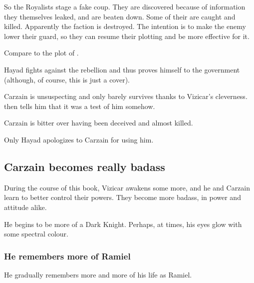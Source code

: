 \begin{garbage}
So the Royalists stage a fake coup. They are discovered because of information they themselves leaked, and are beaten down. Some of their  are caught and killed. Apparently the faction is destroyed. The intention is to make the enemy lower their guard, so they can resume their plotting and be more effective for it. 

Compare to the plot of . 

Hayad fights against the rebellion and thus proves himself  to the government (although, of course, this is just a cover). 

Carzain is unsuspecting and only barely survives thanks to Vizicar's cleverness. \Belzir{} then tells him that it was a test of him somehow. 

Carzain is bitter over having been deceived and almost killed. 

Only Hayad apologizes to Carzain for using him. 







\subsection{Carzain becomes really badass}
During the course of this book, Vizicar awakens some more, and he and Carzain learn to better control their powers. They become more badass, in power and attitude alike. 

He begins to be more of a Dark Knight. Perhaps, at times, his eyes glow with some spectral colour. 





\subsubsection{He remembers more of Ramiel}
He gradually remembers more and more of his life as Ramiel.



\end{garbage}
